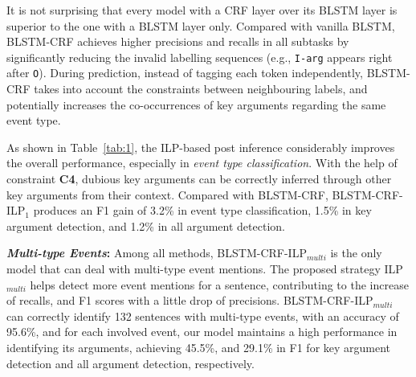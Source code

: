 
It is not surprising that  every model with a CRF layer over its BLSTM layer is superior to the one with a BLSTM layer only. Compared with vanilla BLSTM, BLSTM-CRF achieves higher precisions and recalls in all subtasks by significantly reducing the invalid labelling sequences (e.g., \texttt{I-arg} appears right after \texttt{O}). During prediction, instead of tagging each token independently, BLSTM-CRF takes into account the constraints between neighbouring labels, and potentially increases the co-occurrences of key arguments regarding the same event type. %

As shown in Table~\ref{tab:1}, the ILP-based post inference considerably improves the overall performance, especially in \textit{event type classification}. With the help of constraint \textbf{C4},  dubious key arguments can be correctly inferred through other key arguments from their context. Compared with BLSTM-CRF, BLSTM-CRF-ILP$_1$ produces an F1 gain of 3.2\% in event type classification, 1.5\% in key argument detection, and 1.2\% in all argument detection. %

\vspace{2mm}\noindent\textbf{\emph{Multi-type Events}:}
Among all methods, BLSTM-CRF-ILP$_{multi}$ is the only model that can deal with multi-type event mentions. %
The proposed strategy ILP$_{multi}$ helps detect more event mentions for a sentence, contributing to the increase of recalls, and F1 scores with a little drop of precisions.
BLSTM-CRF-ILP$_{multi}$ can correctly identify 132 sentences with multi-type events,
with an accuracy of 95.6\%, and for each involved event, our model maintains a high
performance in identifying its arguments, achieving 45.5\%, and 29.1\% in F1 for key argument detection and all argument detection, respectively.

